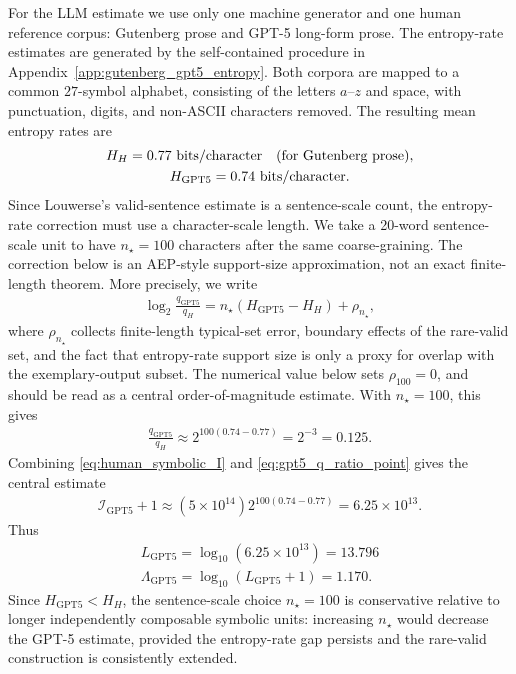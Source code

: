 \documentclass[
  aps,
  prresearch,
  reprint,
  amsmath,
  amssymb,
  superscriptaddress,
  nofootinbib,
  longbibliography
]{revtex4-2}
\def\EQSP{3pt}
\newcommand{\cgather}[2][\EQSP]{\begingroup\setlength\abovedisplayskip{#1}\setlength\belowdisplayskip{#1}\begin{gather} #2 \end{gather}\endgroup\noindent}
\newcommand{\calI}{\mathcal{I}}
\begin{document}
For the LLM estimate we use only one machine generator and one human reference corpus: Gutenberg prose and GPT-5 long-form prose. The entropy-rate estimates are generated by the self-contained procedure in Appendix~\ref{app:gutenberg_gpt5_entropy}. Both corpora are mapped to a common \(27\)-symbol alphabet, consisting of the letters \(a\)--\(z\) and space, with punctuation, digits, and non-ASCII characters removed. The resulting mean entropy rates are
\cgather{
    H_H=0.77\ \mathrm{bits/character}
    \quad\hbox{(for Gutenberg prose)},
    \\
    H_{\mathrm{GPT5}}=0.74\ \mathrm{bits/character}.
    \label{eq:gutenberg_gpt5_entropy_values}
}
Since Louwerse's valid-sentence estimate is a sentence-scale count, the entropy-rate correction must use a character-scale length. We take a 20-word sentence-scale unit to have \(n_\star=100\) characters after the same coarse-graining. The correction below is an AEP-style support-size approximation, not an exact finite-length theorem. More precisely, we write
\cgather{
    \log_2\frac{q_{\mathrm{GPT5}}}{q_H}
    =
    n_\star(H_{\mathrm{GPT5}}-H_H)+\rho_{n_\star},
    \label{eq:entropy_support_correction}
}
where \(\rho_{n_\star}\) collects finite-length typical-set error, boundary effects of the rare-valid set, and the fact that entropy-rate support size is only a proxy for overlap with the exemplary-output subset. The numerical value below sets \(\rho_{100}=0\), and should be read as a central order-of-magnitude estimate. With \(n_\star=100\), this gives
\cgather{
    \frac{q_{\mathrm{GPT5}}}{q_H}
    \approx
    2^{100(0.74-0.77)}
    =2^{-3}=0.125.
    \label{eq:gpt5_q_ratio_point}
}
Combining \eqref{eq:human_symbolic_I} and \eqref{eq:gpt5_q_ratio_point} gives the central estimate
\cgather{
    \calI_{\mathrm{GPT5}}+1
    \approx
    (5\times10^{14})
    2^{100(0.74-0.77)}
    =
    6.25\times10^{13}.
    \label{eq:gpt5_symbolic_I_entropy}
}
Thus
\cgather{
    L_{\mathrm{GPT5}}
    =
    \log_{10}(6.25\times10^{13})
    =13.796
    \\    \Lambda_{\mathrm{GPT5}}
    =
    \log_{10}(L_{\mathrm{GPT5}}+1)
    =1.170.
    \label{eq:gpt5_symbolic_estimate}
}
Since \(H_{\mathrm{GPT5}}<H_H\), the sentence-scale choice \(n_\star=100\) is conservative relative to longer independently composable symbolic units: increasing \(n_\star\) would decrease the GPT-5 estimate, provided the entropy-rate gap persists and the rare-valid construction is consistently extended.
\end{document}
